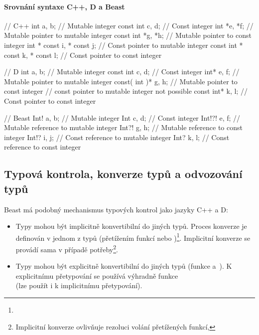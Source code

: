 \paragraph{Srovnání syntaxe C++, D a Beast}
\begin{cppcode}
	// C++
	int a, b; // Mutable integer
	const int c, d; // Const integer
	int *e, *f; // Mutable pointer to mutable integer
	const int *g, *h; // Mutable pointer to const integer
	int * const i, * const j; // Const pointer to mutable integer
	const int * const k, * const l; // Const pointer to const integer
\end{cppcode}
\begin{dcode}
	// D
	int a, b; // Mutable integer
	const int c, d; // Const integer
	int* e, f; // Mutable pointer to mutable integer
	const( int )* g, h; // Mutable pointer to const integer
	// const pointer to mutable integer not possible
	const int* k, l; // Const pointer to const integer
\end{dcode}
\begin{code}
	// Beast
	Int! a, b; // Mutable integer
	Int c, d; // Const integer
	Int!?! e, f; // Mutable reference to mutable integer
	Int?! g, h; // Mutable reference to const integer
	Int!? i, j; // Const reference to mutable integer
	Int? k, l; // Const reference to const integer
\end{code}

\subsection{Typová kontrola, konverze typů a odvozování typů}
Beast má podobný mechanismus typových kontrol jako jazyky C++ a D:
\begin{itemize}
	\item Typy mohou být implicitně konvertibilní do jiných typů. Proces konverze je definován v jednom z typů (přetížením funkcí  nebo )\footnote{}. Implicitní konverze se provádí sama v případě potřeby\footnote{Implicitní konverze ovlivňuje rezoluci volání přetížených funkcí, }.
	\item Typy mohou být explicitně konvertibilní do jiných typů (funkce  a~). K explicitnímu přetypování se používá výhradně funkce\\ (lze použít i k implicitnímu přetypování).
\end{itemize}

